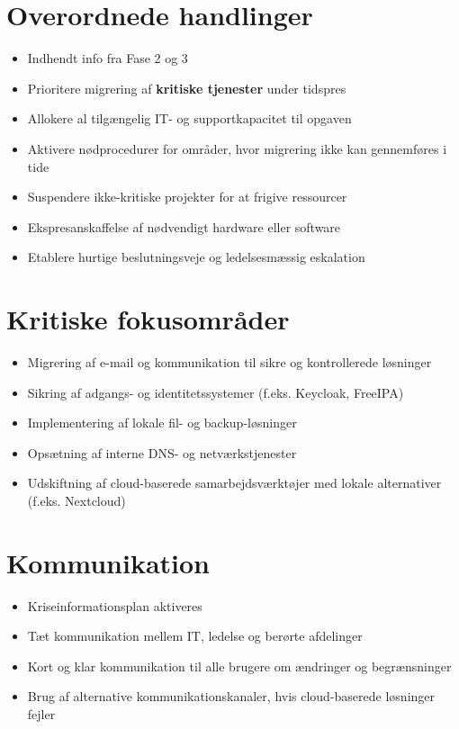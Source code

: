 \documentclass[a4paper,11pt]{book}
\begin{document}
\section{Overordnede handlinger}\label{overordnede-handlinger}

\begin{itemize}
\tightlist
\item
  Indhendt info fra Fase 2 og 3
\item
  Prioritere migrering af \textbf{kritiske tjenester} under tidspres
\item
  Allokere al tilgængelig IT- og supportkapacitet til opgaven
\item
  Aktivere nødprocedurer for områder, hvor migrering ikke kan
  gennemføres i tide
\item
  Suspendere ikke-kritiske projekter for at frigive ressourcer
\item
  Ekspresanskaffelse af nødvendigt hardware eller software
\item
  Etablere hurtige beslutningsveje og ledelsesmæssig eskalation
\end{itemize}

\section{Kritiske fokusområder}\label{kritiske-fokusomruxe5der}

\begin{itemize}
\tightlist
\item
  Migrering af e-mail og kommunikation til sikre og kontrollerede
  løsninger
\item
  Sikring af adgangs- og identitetssystemer (f.eks. Keycloak, FreeIPA)
\item
  Implementering af lokale fil- og backup-løsninger
\item
  Opsætning af interne DNS- og netværkstjenester
\item
  Udskiftning af cloud-baserede samarbejdsværktøjer med lokale
  alternativer (f.eks. Nextcloud)
\end{itemize}

\section{Kommunikation}\label{kommunikation}

\begin{itemize}
\tightlist
\item
  Kriseinformationsplan aktiveres
\item
  Tæt kommunikation mellem IT, ledelse og berørte afdelinger
\item
  Kort og klar kommunikation til alle brugere om ændringer og
  begrænsninger
\item
  Brug af alternative kommunikationskanaler, hvis cloud-baserede
  løsninger fejler
\end{itemize}
\end{document}

